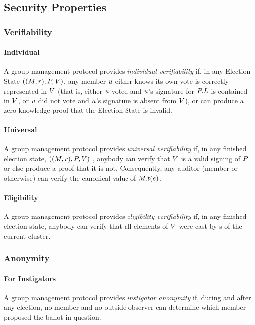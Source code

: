 \subsection{Security Properties}
  \subsubsection{Verifiability}
  \paragraph{Individual}
  A group management protocol provides \emph{individual verifiability} if, in
  any Election State $((M, r), P, V)$, any member
  $u$ either knows its own vote is correctly represented in $V$
  (that is, either $u$ voted and $u$'s signature for
  $P.L$  is contained
  in $V$, or $u$ did not vote and $u$'s signature is
  absent from $V$), or can produce a zero-knowledge proof that the
  Election State is invalid.

  \paragraph{Universal}
  A group management protocol provides \emph{universal verifiability} if, in any
  finished election state, $((M, r), P, V)$ , anybody can
  verify that $V$ is a valid signing of $P$ or else produce a
  proof that it is not. Consequently, any auditor (member or otherwise) can
  verify the canonical value of $M.t(e)$.

  \paragraph{Eligibility}
  A group management protocol provides \emph{eligibility verifiability} if, in
  any finished election state, anybody can verify that all elements of
  $V$ were cast by \KwMember s of the current cluster.

  \subsubsection{Anonymity}
  \paragraph{For Instigators}
  A group management protocol provides \emph{instigator anonymity} if, during
  and after any election, no member and no outside observer can determine
  which member proposed the ballot in question.

